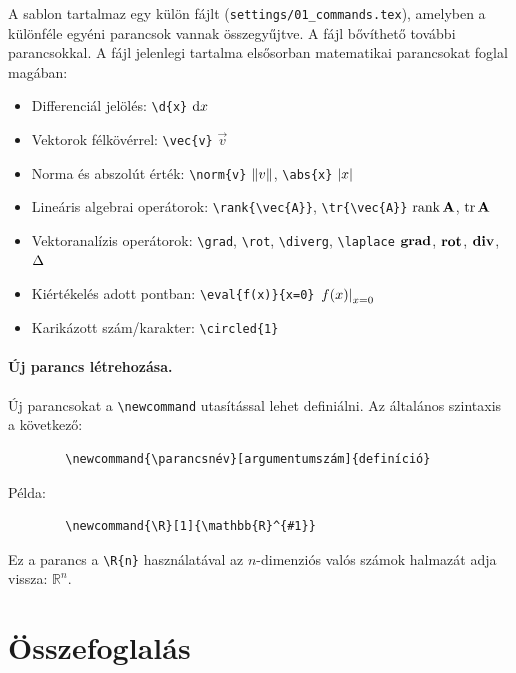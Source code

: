 \documentclass[fleqn,12pt]{article}
\begin{document}
        A sablon tartalmaz egy külön fájlt (\texttt{settings/01\_commands.tex}), amelyben a különféle egyéni parancsok vannak összegyűjtve. A fájl bővíthető további parancsokkal. A fájl jelenlegi tartalma elsősorban matematikai parancsokat foglal magában:
        \begin{itemize}
            \item Differenciál jelölés: \verb|\d{x}| \textrightarrow{} $\mathrm{d}x$
            \item Vektorok félkövérrel: \verb|\vec{v}| \textrightarrow{} $\vec{v}$
            \item Norma és abszolút érték: \verb|\norm{v}| \textrightarrow{} $\left\lVert v \right\rVert$, \verb|\abs{x}| \textrightarrow{} $\left\lvert x \right\rvert$
            \item Lineáris algebrai operátorok: \verb|\rank{\vec{A}}|, \verb|\tr{\vec{A}}| \textrightarrow{} $\operatorname{rank}{\mathbf{A}}$, $\operatorname{tr}{\mathbf{A}}$
            \item Vektoranalízis operátorok: \verb|\grad|, \verb|\rot|, \verb|\diverg|, \verb|\laplace| \textrightarrow{} $\operatorname{\mathbf{grad}}$, $\operatorname{\mathbf{rot}}$, $\operatorname{\mathbf{div}}$, $\operatorname{\Delta}$
            \item Kiértékelés adott pontban: \verb|\eval{f(x)}{x=0}| \textrightarrow{} $\left. f(x) \right|_{x=0}$
            \item Karikázott szám/karakter: \verb|\circled{1}| \textrightarrow{} 
        \end{itemize}

        \paragraph{Új parancs létrehozása.}
        Új parancsokat a \verb|\newcommand| utasítással lehet definiálni. Az általános szintaxis a következő:
        \begin{verbatim}
        \newcommand{\parancsnév}[argumentumszám]{definíció}
        \end{verbatim}

        Példa:
        \begin{verbatim}
        \newcommand{\R}[1]{\mathbb{R}^{#1}}
        \end{verbatim}
        Ez a parancs a \verb|\R{n}| használatával az $n$-dimenziós valós számok halmazát adja vissza: $\mathbb{R}^{n}$.




\section{Összefoglalás}
\end{document}
